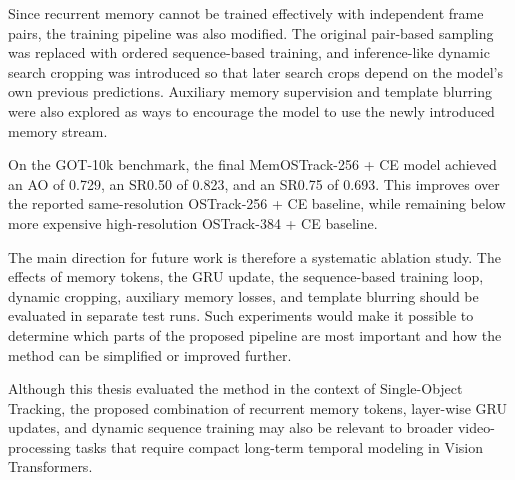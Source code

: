 \documentclass[bachelorthesis]{fer}
\numberwithin{equation}{chapter}
\begin{document}
    Since recurrent memory cannot be trained effectively with independent frame pairs, the
    training pipeline was also modified. The original pair-based sampling was replaced with
    ordered sequence-based training, and inference-like dynamic search cropping was
    introduced so that later search crops depend on the model's own previous predictions.
    Auxiliary memory supervision and template blurring were also explored as ways to
    encourage the model to use the newly introduced memory stream.

    On the GOT-10k benchmark, the final MemOSTrack-256 + CE model achieved an AO of 0.729,
    an SR0.50 of 0.823, and an SR0.75 of 0.693. This improves over the reported
    same-resolution OSTrack-256 + CE baseline, while remaining below more expensive
    high-resolution OSTrack-384 + CE baseline.

    The main direction for future work is therefore a systematic ablation study. The effects
    of memory tokens, the GRU update, the sequence-based training loop, dynamic cropping,
    auxiliary memory losses, and template blurring should be evaluated in separate test
    runs. Such experiments would make it possible to determine which parts of the proposed
    pipeline are most important and how the method can be simplified or improved further.

    Although this thesis evaluated the method in the context of Single-Object Tracking,
    the proposed combination of recurrent memory tokens, layer-wise GRU updates, and
    dynamic sequence training may also be relevant to broader video-processing tasks that
    require compact long-term temporal modeling in Vision Transformers.
\end{document}
